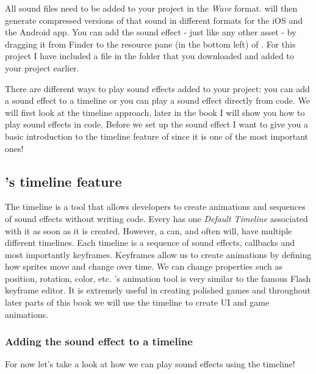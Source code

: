 All sound files need to be added to your \SB{} project in the \textit{Wave}
format. \SB{} will then generate compressed versions of that sound in different
formats for the iOS and the Android app. You can add the sound effect - just
like any other asset - by dragging it from Finder to the resource pane (in the
bottom left) of \SB{}. For this project I have included a 
file in the  folder that you downloaded and added to your
project earlier.

There are different ways to play sound effects added to your \SB{} project: you
can add a sound effect to a \SB{} timeline or you can play a sound effect
directly from code. We will first look at the timeline approach, later in the
book I will show you how to play sound effects in code.
Before we set up the sound effect I want to give you a basic introduction to the timeline feature
of \SB{} since it is one of the most important ones!

\subsection{\SB{}'s timeline feature}
The \SB{} timeline is a tool that allows developers to create animations and
sequences of sound effects without writing code. Every \ccbfile{} has one
\textit{Default Timeline} associated with it as soon as it is created. However,
a \ccbfile{} can, and often will, have multiple different timelines. Each
timeline is a sequence of sound effects, callbacks and most importantly
keyframes. Keyframes allow us to create animations by defining how sprites move
and change over time. We can change properties such as position, rotation,
color, etc. \SB{}'s animation tool is very similar to the famous Flash keyframe
editor. It is extremely useful in creating polished games and throughout later
parts of this book we will use the \SB{} timeline to create UI and game
animations.

\subsubsection{Adding the sound effect to a timeline}
For now let's take a look at how we can play sound effects using the timeline!

